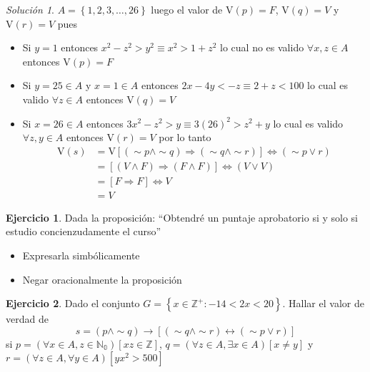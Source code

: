 \documentclass[
  16pt,
]{krantz}
\providecommand{\tightlist}{%
  \setlength{\itemsep}{0pt}\setlength{\parskip}{0pt}}
\theoremstyle{definition}
\theoremstyle{definition}
\theoremstyle{definition}
\newtheorem{exercise}{Ejercicio}[chapter]
\theoremstyle{definition}
\theoremstyle{remark}
\newtheorem*{solution}{Solución}
\begin{document}
\begin{solution}

\(A=\left\{1,2,3,\ldots,26\right\}\) luego el valor de \(\text{V}(p)=F\), \(\text{V}(q)=V\) y \(\text{V}(r)=V\) pues

\begin{itemize}
\tightlist
\item
  Si \(y=1\) entonces \(x^2-z^2>y^2\equiv x^2>1+z^2\) lo cual no es valido \(\forall x,z\in A\) entonces \(\text{V}(p)=F\)
\item
  Si \(y=25\in A\) y \(x=1\in A\) entonces \(2x-4y<-z\equiv 2+z<100\) lo cual es valido \(\forall z\in A\) entonces \(\text{V}(q)=V\)
\item
  Si \(x=26\in A\) entonces \(3x^2-z^2>y\equiv3(26)^2>z^2+y\) lo cual es valido \(\forall z,y\in A\) entonces \(\text{V}(r)=V\) por lo tanto
  \[
  \begin{aligned}
  \text{V}(s)&=\text{V}[(\sim p\wedge \sim q)\Longrightarrow(\sim q\wedge \sim r)]\Longleftrightarrow(\sim p\vee r)\\
  &=[(V\wedge F)\Longrightarrow(F\wedge F)]\Longleftrightarrow(V\vee V)\\
  &=[F\Longrightarrow F]\Longleftrightarrow V\\
  &=V
  \end{aligned}
  \]
\end{itemize}

\end{solution}

\begin{exercise}

Dada la proposición: ``Obtendré un puntaje aprobatorio si y solo si estudio concienzudamente el curso''

\begin{itemize}
\tightlist
\item
  Expresarla simbólicamente
\item
  Negar oracionalmente la proposición
\end{itemize}

\end{exercise}

\begin{exercise}
Dado el conjunto \(G=\left\{x\in\mathbb{Z}^+:-14<2x<20\right\}\). Hallar el valor de verdad de
\[
s=(p\wedge \sim q)\rightarrow[(\sim q\wedge \sim r)\leftrightarrow(\sim p\vee r)]
\]
si
\(p=(\forall x\in A, z\in \mathbb{N_0})[xz\in \mathbb{Z}]\), \(q=(\forall z\in A,\exists x \in A)[x\neq y]\) y \(r=(\forall z\in A, \forall y \in A)[yx^2>500]\)
\end{exercise}
\end{document}
